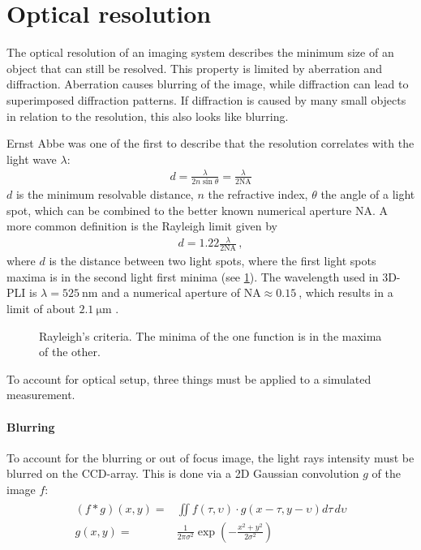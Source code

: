 \section{Optical resolution}
\label{sec:opticalResolution}
%
The optical resolution of an imaging system describes the minimum size of an object that can still be resolved.
This property is limited by aberration and diffraction.
Aberration causes blurring of the image, while diffraction can lead to superimposed diffraction patterns.
If diffraction is caused by many small objects in relation to the resolution, this also looks like blurring.
\par
%
Ernst Abbe was one of the first to describe that the resolution correlates with the light wave $\lambda$:
\begin{align}
d=\frac{ \lambda}{2 n \sin \theta} = \frac{\lambda}{2\mathrm{NA}} 
\end{align}
$d$ is the minimum resolvable distance, $n$ the refractive index, $\theta$ the angle of a light spot, which can be combined to the better known numerical aperture $\mathrm{NA}$.
A more common definition is the Rayleigh limit given by
\begin{align}
d=1.22\frac{\lambda}{2\mathrm{NA}} \, ,
\end{align}
where $d$ is the distance between two light spots, where the first light spots maxima is in the second light first minima (see \cref{fig:rayleigh}).
The wavelength used in \ac{3D-PLI} is $\lambda = \SI{525}{\nano\meter}$ and a numerical aperture of $\mathrm{NA} \approx \SI{0.15}{}$, which results in a limit of about $\SI{2.1}{\micro\meter}$ \cite{MenzelDissertation}.
%
\begin{figure}[!t]
\setlength{\tikzwidth}{0.5\textwidth}
\centering
\caption[Raylay criterium]{Rayleigh's criteria. The minima of the one function is in the maxima of the other.}
\label{fig:rayleigh}
\end{figure}
%
To account for optical setup, three things must be applied to a simulated measurement.
%
\paragraph{Blurring}
To account for the blurring or out of focus image, the light rays intensity must be blurred on the \ac{CCD}-array.
This is done via a 2D Gaussian convolution $g$ of the image $f$:
\begin{align}
\begin{split}
    (f * g)(x,y) =& \iint f(\tau,\upsilon) \cdot g(x-\tau, y-\upsilon)d\tau \, d\upsilon\\
    g(x,y) =& \frac{1}{2\pi\sigma^2} \exp(-\frac{x^2+y^2}{2\sigma^2})
\end{split}
\end{align}
%
